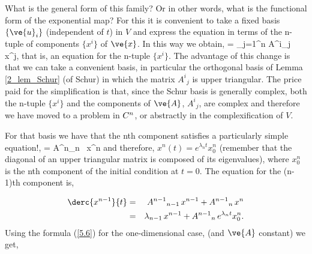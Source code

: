 
\noi What is the general form of this family? Or in other words,
what is the functional form of the exponential map?
For this it is convenient to take a fixed basis $\{\ve{u}_i\}$
(independent of $t$) in $V$ 
and express the equation in terms of the n-tuple of components $\{x^i\}$
of $\ve{x}$.
In this way we obtain,
\beq
{}= \sum_{j=1}^n A^i{}_j \, x^j,      \label{eqn:5.7_b}
\eeq
that is, an equation for the n-tuple $\{x^i\}$.
The advantage of this change is that we can take a convenient basis,
in particular the orthogonal basis of Lemma \ref{2_lem_Schur} (of Schur)
in which the matrix $A^i{}_j$ is upper triangular.
The price paid for the simplification is that, since the Schur basis is generally complex, both the n-tuple $\{x^i\}$ and the
components of $\ve{A}$, $A^i{}_j$, are complex and therefore
we have moved to a problem in $C^n$, or abstractly
in the complexification of $V$.

For that basis we have that the nth component satisfies a
particularly simple equation!,
\beq
{}=  A^n{}_n \, x^n    
\label{eqn:5.7_b_n}
\eeq
and therefore, $x^n(t) =  e^{\lambda_n t}x^n_0$ (remember that the 
diagonal of an upper triangular matrix is composed of its eigenvalues),
where $x^n_0$ is the nth component of the initial condition at $t=0$.
The equation for the (n-1)th component is,


\begin{eqnarray}
\derc{x^{n-1}}{t} &=&  A^{n-1}{}_{n-1} \, x^{n-1} + A^{n-1}{}_n \, x^n \\
                  &=& \lambda_{n-1} \, x^{n-1} + A^{n-1}{}_n \,e^{\lambda_n t}x^n_0 .
\label{eqn:5.7_b_n-1}
\end{eqnarray}
Using the formula (\ref{5.6}) for the one-dimensional case, (and $\ve{A}$
constant) we get,

